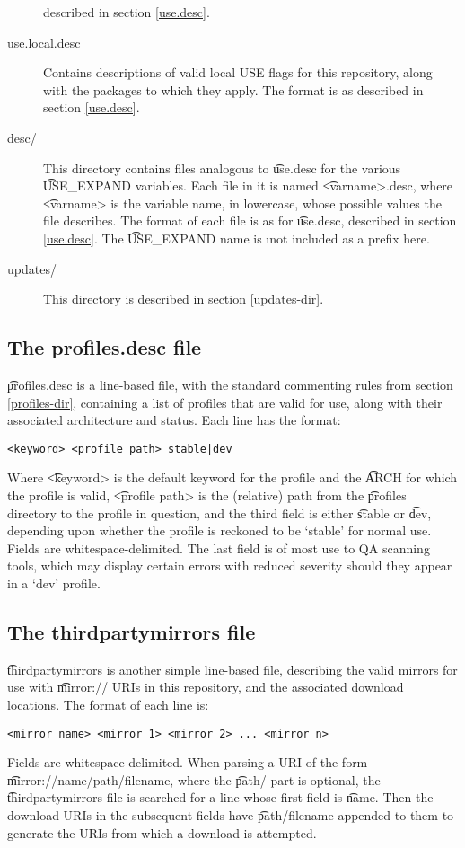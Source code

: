 \begin{description}
    described in section \ref{use.desc}.
\item[use.local.desc] Contains descriptions of valid local USE flags for this repository, along with
    the packages to which they apply. The format is as described in section \ref{use.desc}.
\item[desc/] This directory contains files analogous to \t{use.desc} for the various \t{USE\_EXPAND}
    variables. Each file in it is named \t{<varname>.desc}, where \t{<varname>} is the variable
    name, in lowercase, whose possible values the file describes. The format of each file is as for
    \t{use.desc}, described in section \ref{use.desc}. The \t{USE\_EXPAND} name is \i{not}
    included as a prefix here.
\item[updates/] This directory is described in section \ref{updates-dir}.
\end{description}

\subsection{The profiles.desc file}
\label{profiles.desc}
\t{profiles.desc} is a line-based file, with the standard commenting rules from section
\ref{profiles-dir}, containing a list of profiles that are valid for use, along with their
associated architecture and status. Each line has the format:
\begin{verbatim}
<keyword> <profile path> stable|dev
\end{verbatim}
Where \t{<keyword>} is the default keyword for the profile and the \t{ARCH} for which the profile is
valid, \t{<profile path>} is the (relative) path from the \t{profiles} directory to the profile in
question, and the third field is either \t{stable} or \t{dev}, depending upon whether the profile is
reckoned to be `stable' for normal use. Fields are whitespace-delimited. The last field is of most
use to QA scanning tools, which may display certain errors with reduced severity should they appear
in a `dev' profile.

\subsection{The thirdpartymirrors file}
\label{thirdpartymirrors}
\t{thirdpartymirrors} is another simple line-based file, describing the valid mirrors for use with
\t{mirror://} URIs in this repository, and the associated download locations. The format of each
line is:
\begin{verbatim}
<mirror name> <mirror 1> <mirror 2> ... <mirror n>
\end{verbatim}
Fields are whitespace-delimited. When parsing a URI of the form \t{mirror://name/path/filename},
where the \t{path/} part is optional, the \t{thirdpartymirrors} file is searched for a line whose
first field is \t{name}. Then the download URIs in the subsequent fields have \t{path/filename}
appended to them to generate the URIs from which a download is attempted.

